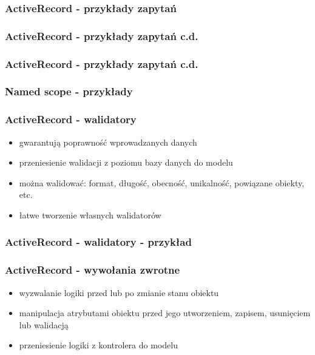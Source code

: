 \documentclass[12t]{beamer}
\begin{document}
\begin{frame}[fragile]
  \frametitle{ActiveRecord - przykłady zapytań}
  \begin{footnotesize}
    
  \end{footnotesize}
\end{frame}

\begin{frame}[fragile]
  \frametitle{ActiveRecord - przykłady zapytań c.d.}
  \begin{footnotesize}
    
  \end{footnotesize}
\end{frame}

\begin{frame}[fragile]
  \frametitle{ActiveRecord - przykłady zapytań c.d.}
  \begin{small}
    
  \end{small}
\end{frame}

\begin{frame}
  \frametitle{Named scope - przykłady}
  \begin{small}
    
  \end{small}
\end{frame}

\begin{frame}
  \frametitle{ActiveRecord - walidatory}
  \begin{itemize}
  \item gwarantują poprawność wprowadzanych danych
  \item przeniesienie walidacji z poziomu bazy danych do modelu
  \item można walidować: format, długość, obecność, unikalność,
    powiązane obiekty, etc.
  \item łatwe tworzenie własnych walidatorów
  \end{itemize}
\end{frame}

\begin{frame}
  \frametitle{ActiveRecord - walidatory - przykład}
  
\end{frame}

\begin{frame}
  \frametitle{ActiveRecord - wywołania zwrotne}
  \begin{itemize}
  \item wyzwalanie logiki przed lub po zmianie stanu obiektu
  \item manipulacja atrybutami obiektu przed jego utworzeniem,
    zapisem, usunięciem lub walidacją
  \item przeniesienie logiki z kontrolera do modelu
  \end{itemize}
\end{frame}
\end{document}
